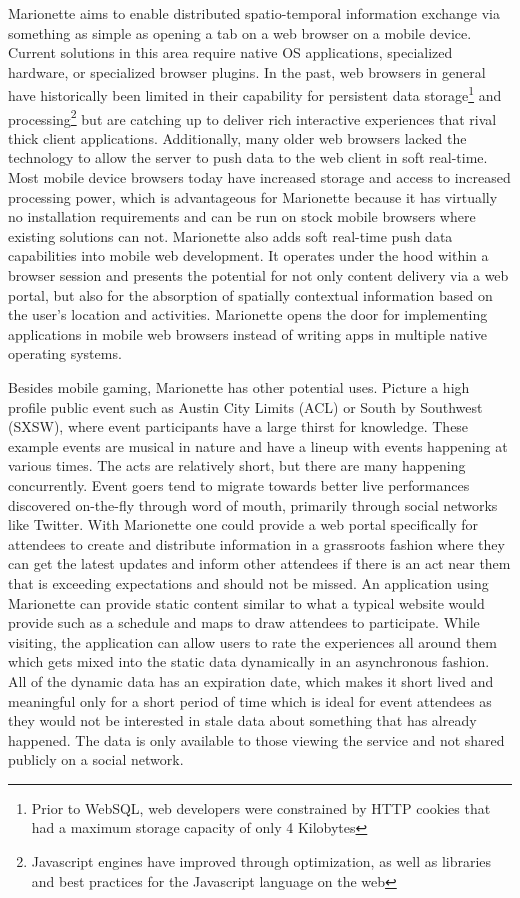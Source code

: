 \documentclass[12pt]{report}	%
\theoremstyle{definition}
\theoremstyle{remark}
\begin{document}
Marionette aims to enable distributed spatio-temporal information
exchange via something as simple as opening a tab on a web browser 
on a mobile device. Current solutions in this area require native OS 
applications, specialized hardware, or specialized browser plugins. 
In the past, web browsers in general have
historically been limited in their capability for persistent data 
storage\footnote{Prior to WebSQL, web developers were constrained by 
HTTP cookies that had a maximum storage capacity of only 4 Kilobytes} 
and processing\footnote{Javascript engines have improved through optimization, as well as 
libraries and best practices for the Javascript language on the web} 
but are catching up to deliver rich interactive experiences
that rival thick client applications. Additionally, many older web browsers
lacked the technology to allow the server to push data to the web client 
in soft real-time. Most mobile device browsers today have
increased storage and access to increased processing power, which is 
advantageous for Marionette because it has virtually no installation 
requirements and can be run on stock mobile browsers where existing 
solutions can not. Marionette also adds soft real-time push data capabilities 
into mobile web development. It operates under the hood
within a browser session and presents the potential for not only content
delivery via a web portal, but also for the absorption of spatially 
contextual information based on the user's location and activities. 
Marionette opens the door for implementing applications in mobile web browsers
instead of writing apps in multiple native operating systems.

Besides mobile gaming, Marionette has other potential uses. Picture a
high profile public event such as Austin City Limits (ACL) or South by
Southwest (SXSW), where event participants have a large thirst for
knowledge. These example events are musical in nature and have a lineup
with events happening at various times. The acts are relatively short,
but there are many happening concurrently. Event goers tend to migrate
towards better live performances discovered on-the-fly through word of mouth,
primarily through social networks like Twitter. With Marionette one
could provide a web portal specifically for attendees to create and distribute 
information in a grassroots
fashion where they can get the latest updates and inform other attendees
if there is an act near them that is exceeding expectations and should
not be missed. An application using Marionette can provide static content 
similar to what a typical website would provide such as a
schedule and maps to draw attendees to participate.  While visiting, the 
application can allow users to rate the experiences all around them which 
gets mixed into the static data dynamically in an asynchronous fashion. 
All of the dynamic data has an expiration date, which makes it
short lived and meaningful only for a short period of time which is ideal 
for event attendees as they would not be interested in stale data about 
something that has already happened. The data is
only available to those viewing the service and not shared publicly on a
social network.
\end{document}
